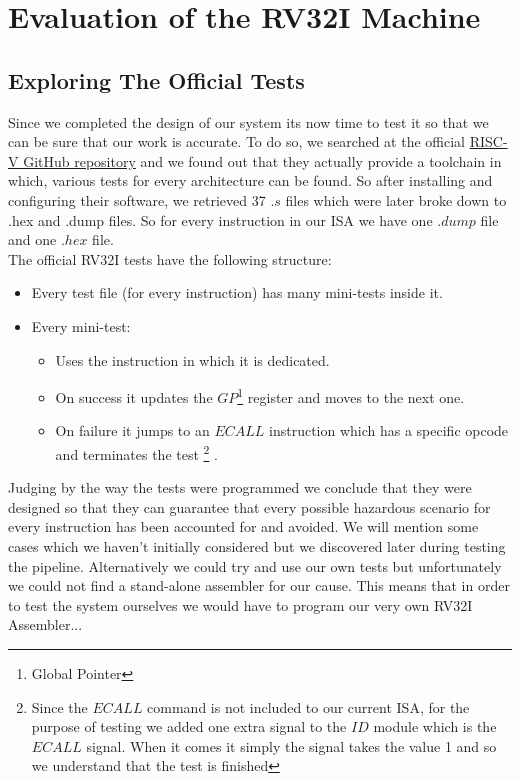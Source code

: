 \chapter{Evaluation of the RV32I Machine}
\label{Chapter4}

\minitoc

\section{Exploring The Official Tests}
\label{Sec4.1:TESTS}

Since we completed the design of our system its now time to test it so that we can be sure that our work is accurate. To do so, we searched at the official  \href{https://github.com/riscv}{RISC-V GitHub repository} and we found out that they actually provide a toolchain in which, various tests for every architecture can be found. So after installing and configuring their software, we retrieved 37 $.s$ files which were later broke down to .hex and .dump files. So for every instruction in our ISA we have one $.dump$ file and one $.hex$ file. \\

The official RV32I tests have the following structure:
\begin{itemize}
	\setlength\itemsep{-0.1em}
	\item Every test file (for every instruction) has many mini-tests inside it. 
	\item Every mini-test:
		\vspace{-2mm}
		\begin{itemize}
			\setlength\itemsep{-0.1em}
			\item Uses the instruction in which it is dedicated.
			\item On success it updates the $GP$\footnote{Global Pointer} register and moves to the next one.
			\item On failure it jumps to an $ECALL$ instruction which has a specific opcode and terminates the test \footnote{Since the $ECALL$ command is not included to our current ISA, for the purpose of testing we added one extra signal to the $ID$ module which is the $ECALL$ signal. When it comes it simply the signal takes the value 1 and so we understand that the test is finished} .
		\end{itemize}
\end{itemize}

Judging by the way the tests were programmed we conclude that they were designed so that they can guarantee that every possible hazardous scenario for every instruction has been accounted for and avoided. We will mention some cases which we haven't initially considered but we discovered later during testing the pipeline. Alternatively we could try and use our own tests but unfortunately we could not find a stand-alone assembler for our cause. This means that in order to test the system ourselves we would have to program our very own RV32I Assembler...\\
\vspace{-6mm}
